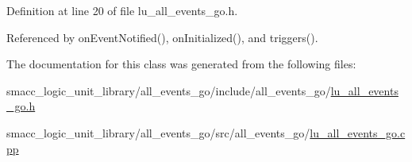 Definition at line 20 of file lu\+\_\+all\+\_\+events\+\_\+go.\+h.



Referenced by on\+Event\+Notified(), on\+Initialized(), and triggers().



The documentation for this class was generated from the following files\+:\begin{DoxyCompactItemize}
\item 
smacc\+\_\+logic\+\_\+unit\+\_\+library/all\+\_\+events\+\_\+go/include/all\+\_\+events\+\_\+go/\hyperlink{lu__all__events__go_8h}{lu\+\_\+all\+\_\+events\+\_\+go.\+h}\item 
smacc\+\_\+logic\+\_\+unit\+\_\+library/all\+\_\+events\+\_\+go/src/all\+\_\+events\+\_\+go/\hyperlink{lu__all__events__go_8cpp}{lu\+\_\+all\+\_\+events\+\_\+go.\+cpp}\end{DoxyCompactItemize}
